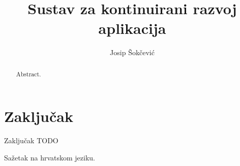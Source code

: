 \documentclass[times, utf8, numeric, diplomski]{ferit}
\begin{document}
\sloppy
{} %
\title{Sustav za kontinuirani razvoj aplikacija}

\author{Josip Šokčević}
\maketitle



\tableofcontents









\chapter{Zaključak}
Zaključak TODO




\begin{sazetak}
Sažetak na hrvatskom jeziku.
\end{sazetak}

\begin{abstract}
Abstract.

\end{abstract}
\end{document}
